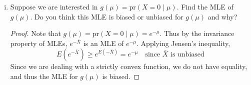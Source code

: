 \documentclass[letterpaper, 12pt]{article}\usepackage{graphicx, color}
\newcommand{\pr}{\text{pr}}
\newcommand{\sbs}{\;|\;} %
\begin{document}
\begin{enumerate}
\begin{enumerate}[(i)]
\begin{proof}
To show that it is a minimal sufficient statistic for $\mu$, we use theorem 6.2.13 in Casella and Berger, pg. 281. Suppose $Y_1, \cdots, Y_{50}$ had the same MLE as $X_1, \cdots, X_{50}$ with $\bar{Y} = \bar{X}$. Then
\begin{align}
\frac{f( \mathbf{x}|\theta)}{f(\mathbf{y} | \theta)} 
&=
\prod_{i=1}^{50}
\frac{\mu^{x_i}}{x_i!} e^{-\mu}
/
\prod_{i=1}^{50}
\frac{\mu^{y_i}}{y_i!} e^{-\mu} \\
&=
\left(\mu^{\sum_{i=1}^{50}x_i}
\prod_{i=1}^{50}
\frac{1}{x_i!} e^{-\mu} \right)
/
\left(\mu^{\sum_{i=1}^{50}y_i}
\prod_{i=1}^{50}
\frac{1}{y_i!} e^{-\mu} \right)\\
&=
\prod_{i=1}^{50}
\frac{1}{x_i!} 
/
\prod_{i=1}^{50}
\frac{1}{y_i!}
\end{align}
since $\sum_{i=1}^{50}x_i = \sum_{i=1}^{50}y_i$. Thus (15) is constant as a function of $\mu$. Now suppose 
\begin{align}
\frac{f( \mathbf{x}|\theta)}{f(\mathbf{y} | \theta)} 
&=
\left(\mu^{\sum_{i=1}^{50}x_i}
\prod_{i=1}^{50}
\frac{1}{x_i!} e^{-\mu} \right)
/
\left(\mu^{\sum_{i=1}^{50}y_i}
\prod_{i=1}^{50}
\frac{1}{y_i!} e^{-\mu} \right) 
\end{align}
is constant as a function of $\mu$. Thus 
\begin{equation}
\mu^{\sum_{i=1}^{50}x_i} = \mu^{\sum_{i=1}^{50}y_i}
\end{equation}
for all $x_i$ and $y_i$. Therefore (19) is equal to a constant, and thus 
\begin{equation}
\sum_{i=1}^{50}x_i = \sum_{i=1}^{50}y_i
\end{equation}
and $\bar{X} = \bar{Y}$. Now by the theorem we conclude that $\bar{X}$ is a minimal sufficient statistic.
\end{proof}
\item
Suppose we are interested in $g(\mu) = \pr(X=0 \sbs \mu)$. Find the MLE of $g(\mu)$. Do you think this MLE is biased or unbiased for $g(\mu)$ and why?
\begin{proof}
Note that $g(\mu) = \pr(X=0 \sbs \mu) = e^{-\mu}$. Thus by the invariance property of MLEs, $e^{-\bar{X}}$ is an MLE of $e^{-\mu}$. Applying Jensen's inequality, 
\begin{equation}
E (e ^{- \bar{X}}) \geq e^{E(-\bar{X})} = e^{-\mu}
\quad \text{since $\bar{X}$ is unbiased}
\end{equation}
Since we are dealing with a strictly convex function, we do not have equality, and thus the MLE for $g(\mu)$ is biased.
\end{proof}

\end{enumerate}
\end{enumerate}
\end{document}
